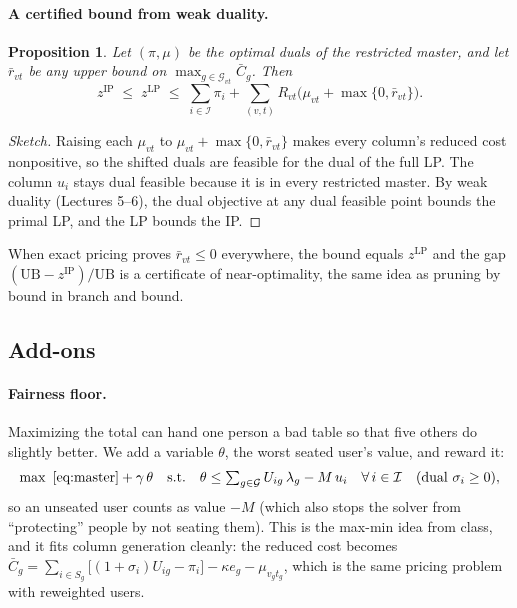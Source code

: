 \documentclass[10pt]{article}
\newtheorem{proposition}{Proposition}
\newcommand{\I}{\mathcal{I}}
\newcommand{\G}{\mathcal{G}}
\begin{document}
\paragraph{A certified bound from weak duality.}
\begin{proposition}
Let $(\pi,\mu)$ be the optimal duals of the restricted master, and let $\bar r_{vt}$ be any upper bound on $\max_{g\in\G_{vt}} \bar C_g$. Then
\begin{equation}
z^{\text{IP}} \;\le\; z^{\text{LP}} \;\le\; \textstyle\sum_{i\in\I}\pi_i + \sum_{(v,t)} R_{vt}\bigl(\mu_{vt}+\max\{0,\bar r_{vt}\}\bigr).
\label{eq:ub}
\end{equation}
\end{proposition}
\begin{proof}[Sketch]
Raising each $\mu_{vt}$ to $\mu_{vt}+\max\{0,\bar r_{vt}\}$ makes every column's reduced cost nonpositive, so the shifted duals are feasible for the dual of the full LP. The column $u_i$ stays dual feasible because it is in every restricted master. By weak duality (Lectures 5--6), the dual objective at any dual feasible point bounds the primal LP, and the LP bounds the IP.
\end{proof}
\noindent When exact pricing proves $\bar r_{vt}\le 0$ everywhere, the bound equals $z^{\text{LP}}$ and the gap $(\text{UB}-z^{\text{IP}})/\text{UB}$ is a certificate of near-optimality, the same idea as pruning by bound in branch and bound.

\subsection{Add-ons}
\label{sec:addons}

\paragraph{Fairness floor.} Maximizing the total can hand one person a bad table so that five others do slightly better. We add a variable $\theta$, the worst seated user's value, and reward it:
\begin{equation}
\max\ \eqref{eq:master} + \gamma\,\theta
\quad\text{s.t.}\quad
\theta \le \textstyle\sum_{g\in\G} U_{ig}\,\lambda_g - M\,u_i \quad \forall\, i\in\I \quad(\text{dual } \sigma_i\ge 0),
\end{equation}
so an unseated user counts as value $-M$ (which also stops the solver from ``protecting'' people by not seating them). This is the max-min idea from class, and it fits column generation cleanly: the reduced cost becomes $\bar C_g = \sum_{i\in S_g}\bigl[(1+\sigma_i)U_{ig}-\pi_i\bigr]-\kappa e_g-\mu_{v_gt_g}$, which is the same pricing problem with reweighted users.
\end{document}

